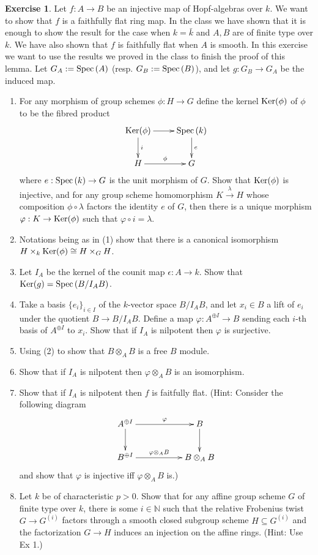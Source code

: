 \documentclass[12pt]{amsart}
\theoremstyle{plain}
\theoremstyle{definition}
\newtheorem{ex}{Exercise}
\numberwithin{Aufgabe}{section}
\newcommand{\Ker}{{\rm Ker}}
\newcommand{\Spec}{{\rm Spec \,}}
\newcommand{\B}{{\mathbb B}}
\newcommand{\N}{{\mathbb N}}
\begin{document}
\begin{ex}
Let $f:A\to B$ be an injective map of Hopf-algebras over $k$. We want to show that $f$ is a faithfully flat ring map. In the class we have shown that it is enough to show the result for the case when $k=\bar{k}$ and $A, B$ are of finite type over $k$. We have also shown that $f$ is faithfully flat when $A$ is smooth.  In this exercise we want to use the results we proved in the class to finish the proof of this lemma.  Let $G_A:=\Spec(A)$ (resp. $G_B:=\Spec(B)$), and let $g: G_B\to G_A$ be the induced map.
\begin{enumerate} \item For any morphism of group schemes $\phi:H\to G$ define the kernel $\Ker(\phi)$ of $\phi$ to be the fibred product $$\xymatrix{\Ker(\phi)\ar[r]\ar[d]^{i}&\Spec(k)\ar[d]^-e\\ H\ar[r]^-{\phi}&G}$$ where $e:\Spec(k)\to G$ is the unit morphism  of $G$. Show that $\Ker(\phi)$ is injective, and for any group scheme homomorphism $K\xrightarrow{\lambda}H$ whose composition $\phi\circ \lambda$ factors the identity  $e$ of $G$, then there is a unique morphism $\varphi: K\to \Ker(\phi)$ such that $\varphi\circ i=\lambda$. 
\item  Notations being as in (1) show that there is a canonical isomorphism $ H\times_k\Ker(\phi)\cong H\times_GH$.
\item Let $I_A$ be  the kernel  of the counit map $\epsilon:A\to k$. Show that $\Ker(g)=\Spec(B/I_AB)$.  
\item Take a basis $\{e_i\}_{i\in I}$ of the $k$-vector space $B/I_AB$, and let $x_i\in B$ a lift of  $e_i$ under the quotient $B\to B/I_AB$. Define a map $\varphi: A^{\oplus I}\to B$ sending each $i $-th basis of $ A^{\oplus I}$ to $x_i$. Show that if $I_A$ is nilpotent then $\varphi$ is surjective.
\item Using (2) to show that $B\otimes_AB$ is a free $B$ module.
\item Show that if $I_A$ is nilpotent then $\varphi\otimes_A B$ is an isomorphism.
\item Show that if $I_A$ is nilpotent then $f$ is faitfully flat. (Hint: Consider the following diagram $$\xymatrix{A^{\oplus I}\ar[rr]^-{\varphi}\ar[d]&&B\ar[d]\\B^{\oplus I}\ar[rr]^-{\varphi\otimes_AB}&&B\otimes_AB}$$ and show that $\varphi$ is injective iff $\varphi\otimes_AB$ is.)
\item Let $k$ be of characteristic $p>0$. Show that for any affine group scheme $G$ of finite type over $k$,  there is some $i\in \N$ such that the relative Frobenius twist $G\to G^{(i)}$ factors through a smooth closed subgroup scheme $H\subseteq G^{(i)}$ and the factorization $G\to H$ induces an injection on the affine rings. (Hint:  Use Ex 1.)

\end{enumerate}
\end{ex}
\end{document}
